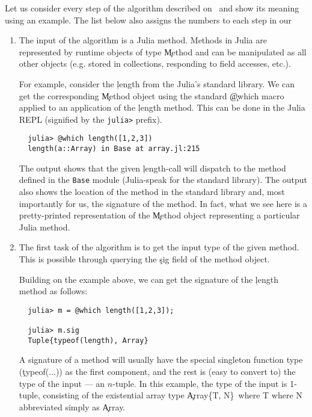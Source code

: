 \documentclass[sigplan,review,anonymous]{acmart}
\begin{document}
Let us consider every step of the algorithm described
on~ and show its meaning using an example.
The list below also assigns the numbers to each step in our
\begin{enumerate}

  \item The input of the algorithm is a Julia method. Methods in Julia are
  represented by runtime objects of type \c{Method} and can be manipulated as
  all other objects (e.g. stored in collections, responding to field accesses, etc.).

  For example, consider the \c{length} from the Julia's standard library. We can
  get the corresponding \c{Method} object using the standard \c{@which} macro
  applied to an application of the \c{length} method. This can be done in the
  Julia REPL (signified by the \texttt{julia>} prefix).
\begin{verbatim}
  julia> @which length([1,2,3])
  length(a::Array) in Base at array.jl:215
\end{verbatim}

  The output shows that the given \c{length}-call will dispatch to the
  method defined in the \texttt{Base} module (Julia-speak for the standard
  library). The output also shows the location of the method in the
  standard library and, most importantly for us, the signature of the
  method. In fact, what we see here is a pretty-printed representation of
  the \c{Method} object representing a particular Julia method.

  \item The first task of the algorithm is to get the input type of the given
  method. This is possible through querying the \c{sig} field of the method object.

  Building on the example above, we can get the signature of the \c{length}
  method as follows:
\begin{verbatim}
  julia> m = @which length([1,2,3]);

  julia> m.sig
  Tuple{typeof(length), Array}
\end{verbatim}

  A signature of a method will usually have the special singleton function
  type (\c{typeof(...)}) as the first component, and the rest is (easy to
  convert to) the type of the input --- an $n$-tuple. In this example, the type of
  the input is 1-tuple, consisting of the existential array type
  \c{Array\{T, N\}\ where T where N} abbreviated simply as \c{Array}.


\end{enumerate}
\end{document}
